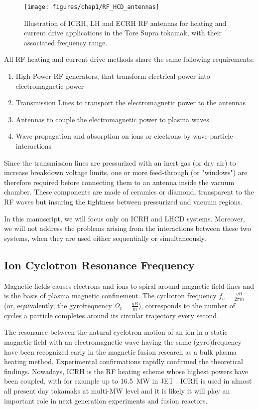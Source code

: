 \begin{figure*}
	\centering
	\texttt{[image: figures/chap1/RF\_HCD\_antennas]}
	\caption{Illustration of ICRH, LH and ECRH RF antennas for heating and current drive applications in the Tore Supra tokamak, with their associated frequency range.}
	\label{fig:rfhcdantennas}
\end{figure*}

All RF heating and current drive methods share the same following requirements:
\begin{enumerate}
	\item High Power RF generators, that transform electrical power into electromagnetic power
	\item Transmission Lines to transport the electromagnetic power to the antennas
	\item Antennas to couple the electromagnetic power to plasma waves
	\item Wave propagation and absorption on ions or electrons by wave-particle interactions
\end{enumerate}

Since the transmission lines are pressurized with an inert gas (or dry air) to increase breakdown voltage limits, one or more feed-through (or "windows") are therefore required before connecting them to an antenna inside the vacuum chamber. These components are made of ceramics or diamond, transparent to the RF waves but insuring the tightness between pressurized and vacuum regions.

In this manuscript, we will focus only on ICRH and LHCD systems. Moreover, we will not address the problems arising from the interactions between these two systems, when they are used either sequentially or simultaneously.



\subsection{Ion Cyclotron Resonance Frequency}
Magnetic fields causes electrons and ions to spiral around magnetic field lines and is the basis of plasma magnetic confinement. The cyclotron frequency $f_c = \frac{q B}{2\pi m}$ (or, equivalently, the gyrofrequency $\Omega_c = \frac{q B}{m}$), corresponds to the number of cycles a particle completes around its circular trajectory every second.

The resonance between the natural cyclotron motion of an ion in a static magnetic field with an electromagnetic wave having the same (gyro)frequency have been recognized early in the magnetic fusion research as a bulk plasma heating method. Experimental confirmations rapidly confirmed the theoretical findings. Nowadays, ICRH is the RF heating scheme whose highest powers have been coupled, with for example up to 16.5~\si{MW} in JET . ICRH is used in almost all present day tokamaks at multi-\si{MW} level and it is likely it will  play an important role in next generation experiments and fusion reactors.

